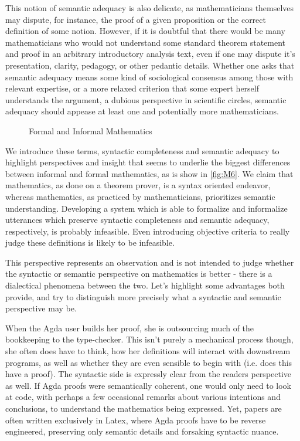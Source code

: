 This notion of semantic adequacy is also delicate, as mathematicians themselves
may dispute, for instance, the proof of a given proposition or the correct
definition of some notion. However, if it is doubtful that there would be many
mathematicians who would not understand some standard theorem statement and
proof in an arbitrary introductory analysis text, even if one may dispute it's
presentation, clarity, pedagogy, or other pedantic details. Whether one asks
that semantic adequacy means some kind of sociological consensus among those
with relevant expertise, or a more relaxed criterion that some expert herself
understands the argument, a dubious perspective in scientific circles, semantic
adequacy should appease at least one and potentially more mathematicians.


\begin{figure}[H]
\centering
{}
\caption{Formal and Informal Mathematics} \label{fig:M6}
\end{figure}

We introduce these terms, syntactic completeness and semantic adequacy to
highlight perspectives and insight that seems to underlie the biggest
differences between informal and formal mathematics, as is show in
\autoref{fig:M6}. We claim that mathematics, as done on a theorem prover, is a
syntax oriented endeavor, whereas mathematics, as practiced by mathematicians,
prioritizes semantic understanding. Developing a system which is able to
formalize and informalize utterances which preserve syntactic completeness and
semantic adequacy, respectively, is probably infeasible. Even introducing
objective criteria to really judge these definitions is likely to be infeasible.

This perspective represents an observation and is not intended to judge whether
the syntactic or semantic perspective on mathematics is better - there is a
dialectical phenomena between the two. Let's highlight some advantages both
provide, and try to distinguish more precisely what a syntactic and semantic
perspective may be. 

When the Agda user builds her proof, she is outsourcing much of the bookkeeping
to the type-checker. This isn't purely a mechanical process though, she often
does have to think, how her definitions will interact with downstream programs,
as well as whether they are even sensible to begin with (i.e. does this have a
proof). The syntactic side is expressly clear from the readers perspective as
well. If Agda proofs were semantically coherent, one would only need to look at
code, with perhaps a few occasional remarks about various intentions and
conclusions, to understand the mathematics being expressed. Yet, papers are
often written exclusively in Latex, where Agda proofs have to be reverse
engineered, preserving only semantic details and forsaking syntactic nuance.


